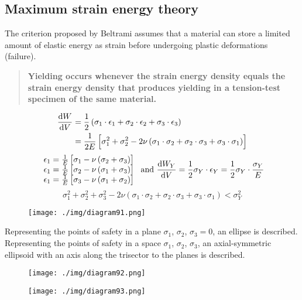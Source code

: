 \subsection{Maximum strain energy theory}
The criterion proposed by Beltrami assumes that a material can store a limited amount of elastic energy as strain before undergoing plastic deformations (failure).
\begin{quotation}
  \textbf{Yielding occurs whenever the strain energy density equals the strain energy density that produces yielding in a tension-test specimen of the same material.}
\end{quotation}
\begin{align}
  \frac{\dif W}{\dif V} & = \frac{1}{2} \left( \sigma_1 \cdot \epsilon_1 + \sigma_2 \cdot \epsilon_2 + \sigma_3 \cdot \epsilon_3 \right)                                        \\
                        & = \frac{1}{2E} \left[ \sigma_1^2 + \sigma_2^2 - 2\nu\left(\sigma_1 \cdot \sigma_2 + \sigma_2 \cdot \sigma_3 + \sigma_3 \cdot \sigma_1 \right) \right]
\end{align}
\begin{equation}
  \begin{array}{l}
    \epsilon_1 = \frac{1}{E} \left[\sigma_1 - \nu \left(\sigma_2 + \sigma_3\right)\right] \\
    \epsilon_1 = \frac{1}{E} \left[\sigma_2 - \nu \left(\sigma_1 + \sigma_3\right)\right] \\
    \epsilon_1 = \frac{1}{E} \left[\sigma_3 - \nu \left(\sigma_1 + \sigma_2\right)\right]
  \end{array} \textrm{ and } \frac{\dif W_Y}{\dif V} = \frac{1}{2} \sigma_Y \cdot \epsilon_Y = \frac{1}{2}\sigma_Y \cdot \frac{\sigma_Y}{E}
\end{equation}
\begin{equation}
  \sigma_1^2 + \sigma_2^2 + \sigma_3^2 - 2\nu \left(\sigma_1 \cdot \sigma_2 + \sigma_2 \cdot \sigma_3 + \sigma_3 \cdot \sigma_1 \right) < \sigma_Y^2
\end{equation}
\begin{figure}[H]
  \centering
  \texttt{[image: ./img/diagram91.png]}
  \caption{}
\end{figure}
Representing the points of safety in a plane $\sigma_1$, $\sigma_2$, $\sigma_3 = 0$, an ellipse is described. Representing the points of safety in a space $\sigma_1$, $\sigma_2$, $\sigma_3$, an axial-symmetric ellipsoid with an axis along the trisector to the planes is described.
\begin{figure}
  \begin{center}
    \begin{minipage}[b]{0.46\textwidth}
      \centering
      \texttt{[image: ./img/diagram92.png]}
      \caption{}
    \end{minipage}
    \begin{minipage}[b]{0.46\textwidth}
      \centering
      \texttt{[image: ./img/diagram93.png]}
      \caption{}
    \end{minipage}
  \end{center}
\end{figure}
